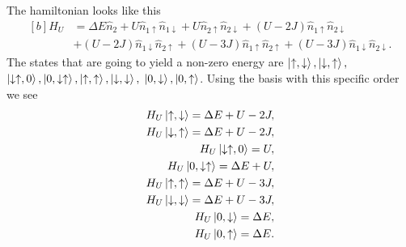 \begin{questions}
\begin{solution}
The hamiltonian looks like this
\begin{equation}
  \begin{aligned}[b]
    H_U &= \Delta E \hat{n}_2 + U \hat{n}_{1\uparrow} \hat{n}_{1\downarrow} + U \hat{n}_{2\uparrow} \hat{n}_{2\downarrow} + (U-2J)\hat{n}_{1\uparrow} \hat{n}_{2\downarrow} \\
    &+ (U-2J)\hat{n}_{1\downarrow} \hat{n}_{2\uparrow}
  + (U-3J)\hat{n}_{1\uparrow} \hat{n}_{2\uparrow} + (U-3J)\hat{n}_{1\downarrow} \hat{n}_{2\downarrow} .
\end{aligned}
\end{equation}
The states that are going to yield a non-zero energy are $\ket{\uparrow,\downarrow}, \ket{\downarrow, \uparrow},$ $ \ket{\downarrow  \uparrow , 0} , \ket{0,\downarrow \uparrow}, \ket{\uparrow, \uparrow}, \ket{\downarrow, \downarrow} ,$ $ \ket{0,\downarrow}, \ket{0, \uparrow}$. Using the basis with this specific order we see
\begin{eqnarray}
  H_U \ket{\uparrow,\downarrow} = \Delta E + U- 2J,\\
  H_U \ket{\downarrow, \uparrow} =  \Delta E + U -2J,\\
  H_U \ket{\downarrow  \uparrow , 0} = U, \\
  H_U \ket{0,\downarrow \uparrow} = \Delta E + U,\\
  H_U \ket{\uparrow, \uparrow} = \Delta E+ U - 3J, \\
  H_U \ket{\downarrow, \downarrow} = \Delta E+ U - 3J,\\
  H_U \ket{0,\downarrow} = \Delta E,\\
  H_U \ket{0, \uparrow} = \Delta E.
\end{eqnarray}


\end{solution}
\end{questions}
